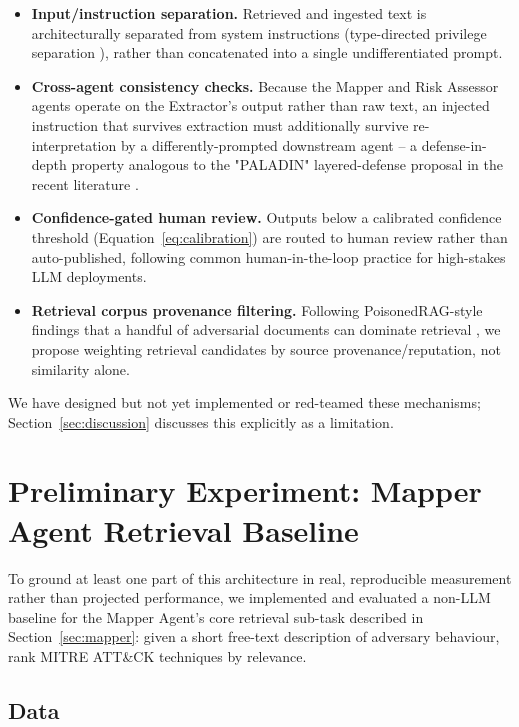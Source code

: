 \documentclass[runningheads]{llncs}
\begin{document}
\begin{itemize}
    \item \textbf{Input/instruction separation.} Retrieved and ingested text is architecturally separated from system instructions (type-directed privilege separation \cite{promptinjectionreview2026}), rather than concatenated into a single undifferentiated prompt.
    \item \textbf{Cross-agent consistency checks.} Because the Mapper and Risk Assessor agents operate on the Extractor's output rather than raw text, an injected instruction that survives extraction must additionally survive re-interpretation by a differently-prompted downstream agent -- a defense-in-depth property analogous to the "PALADIN" layered-defense proposal in the recent literature \cite{promptinjectionreview2026}.
    \item \textbf{Confidence-gated human review.} Outputs below a calibrated confidence threshold (Equation~\ref{eq:calibration}) are routed to human review rather than auto-published, following common human-in-the-loop practice for high-stakes LLM deployments.
    \item \textbf{Retrieval corpus provenance filtering.} Following PoisonedRAG-style findings that a handful of adversarial documents can dominate retrieval \cite{poisonedrag2025}, we propose weighting retrieval candidates by source provenance/reputation, not similarity alone.
\end{itemize}

We have designed but not yet implemented or red-teamed these mechanisms; Section~\ref{sec:discussion} discusses this explicitly as a limitation.

\section{Preliminary Experiment: Mapper Agent Retrieval Baseline}
\label{sec:experiment}

To ground at least one part of this architecture in real, reproducible measurement rather than projected performance, we implemented and evaluated a non-LLM baseline for the Mapper Agent's core retrieval sub-task described in Section~\ref{sec:mapper}: given a short free-text description of adversary behaviour, rank MITRE ATT\&CK techniques by relevance.

\subsection{Data}
\end{document}
